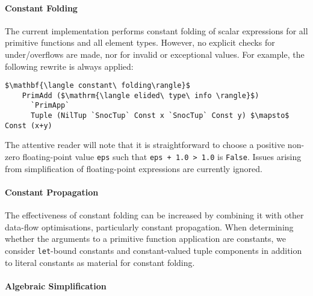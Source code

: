 \paragraph{Constant Folding}

The current implementation performs constant folding of scalar expressions for
all primitive functions and all element types. However, no explicit checks for
under/overflows are made, nor for invalid or exceptional values. For example,
the following rewrite is always applied:
%
%
\begin{lstlisting}[style=Haskell,numbers=none,mathescape]
$\mathbf{\langle constant\ folding\rangle}$
    PrimAdd ($\mathrm{\langle elided\ type\ info \rangle}$)
      `PrimApp`
      Tuple (NilTup `SnocTup` Const x `SnocTup` Const y) $\mapsto$ Const (x+y)
\end{lstlisting}
%
The attentive reader will note that it is straightforward to choose a positive
non-zero floating-point value \texttt{eps} such that \lstinline{eps + 1.0 > 1.0}
is \texttt{False}. Issues arising from simplification of floating-point
expressions are currently ignored.



\paragraph{Constant Propagation}

The effectiveness of constant folding can be increased by combining it with
other data-flow optimisations, particularly constant propagation. When
determining whether the arguments to a primitive function application are
constants, we consider \texttt{let}-bound constants and constant-valued tuple
components in addition to literal constants as material for constant folding.


\paragraph{Algebraic Simplification}

